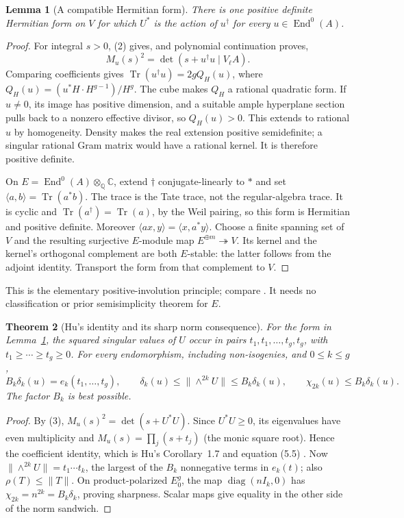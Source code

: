 \documentclass[11pt]{article}
\newtheorem{theorem}{Theorem}
\newtheorem{lemma}[theorem]{Lemma}
\theoremstyle{remark}\newtheorem{remark}[theorem]{Remark}
\newcommand{\End}{\operatorname{End}}
\newcommand{\Tr}{\operatorname{Tr}}
\newcommand{\Q}{\mathbb Q}\newcommand{\R}{\mathbb R}\newcommand{\C}{\mathbb C}
\begin{document}
\begin{lemma}[A compatible Hermitian form]\label{hermitian}
There is one positive definite Hermitian form on $V$ for which
$U^*$ is the action of $u^\dagger$ for every $u\in\End^0(A)$.
\end{lemma}
\begin{proof}
For integral $s>0$, (2) gives, and polynomial continuation proves,
\[
 M_u(s)^2=\det(s+u^\dagger u\mid V_\ell A).
 \tag{3}
\]
Comparing coefficients gives
$\Tr(u^\dagger u)=2g Q_H(u)$, where
$Q_H(u)=(u^*H\cdot H^{g-1})/H^g$. The cube makes $Q_H$ a rational
quadratic form. If $u\ne0$, its image has positive dimension, and a
suitable ample hyperplane section pulls back to a nonzero effective
divisor, so $Q_H(u)>0$. This extends to rational $u$ by homogeneity.
Density makes the real extension positive semidefinite; a singular
rational Gram matrix would have a rational kernel. It is therefore
positive definite.

On $E=\End^0(A)\otimes_\Q\C$, extend $\dagger$ conjugate-linearly to
$*$ and set $\langle a,b\rangle=\Tr(a^*b)$. The trace is the Tate
trace, not the regular-algebra trace. It is cyclic and
$\Tr(a^\dagger)=\Tr(a)$, by the Weil pairing, so this form is Hermitian
and positive definite. Moreover
$\langle ax,y\rangle=\langle x,a^*y\rangle$.
Choose a finite spanning set of $V$ and the resulting surjective
$E$-module map $E^{\oplus m}\twoheadrightarrow V$. Its kernel and the
kernel's orthogonal complement are both $E$-stable: the latter follows
from the adjoint identity. Transport the form from that complement to $V$.
\end{proof}
This is the elementary positive-involution principle; compare
\cite[Proposition 8.10]{Milne}. It needs no classification or prior
semisimplicity theorem for $E$.

\begin{theorem}[Hu's identity and its sharp norm consequence]\label{finite}
For the form in Lemma~\ref{hermitian}, the squared singular values of $U$
occur in pairs $t_1,t_1,\ldots,t_g,t_g$, with $t_1\ge\cdots\ge t_g\ge0$.
For every endomorphism, including non-isogenies, and $0\le k\le g$,
\[
 B_k\delta_k(u)=e_k(t_1,\ldots,t_g),\qquad
 \delta_k(u)\le\|\wedge^{2k}U\|\le B_k\delta_k(u),\qquad
 \chi_{2k}(u)\le B_k\delta_k(u).
 \tag{4}
\]
The factor $B_k$ is best possible.
\end{theorem}
\begin{proof}
By (3), $M_u(s)^2=\det(s+U^*U)$. Since $U^*U\ge0$, its eigenvalues
have even multiplicity and $M_u(s)=\prod_j(s+t_j)$ (the monic square
root). Hence the coefficient identity, which is Hu's Corollary~1.7
and equation (5.5) \cite{Hu}. Now
$\|\wedge^{2k}U\|=t_1\cdots t_k$, the largest of the $B_k$ nonnegative
terms in $e_k(t)$; also $\rho(T)\le\|T\|$. On product-polarized $E_0^g$,
the map $\operatorname{diag}(nI_k,0)$ has
$\chi_{2k}=n^{2k}=B_k\delta_k$, proving sharpness. Scalar maps give
equality in the other side of the norm sandwich.
\end{proof}
\end{document}
